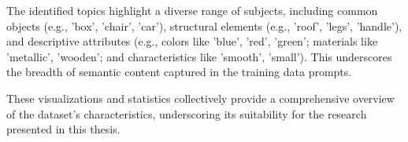 The identified topics highlight a diverse range of subjects, including common objects (e.g., 'box', 'chair', 'car'), structural elements (e.g., 'roof', 'legs', 'handle'), and descriptive attributes (e.g., colors like 'blue', 'red', 'green'; materials like 'metallic', 'wooden'; and characteristics like 'smooth', 'small'). This underscores the breadth of semantic content captured in the training data prompts.

These visualizations and statistics collectively provide a comprehensive overview of the dataset's characteristics, underscoring its suitability for the research presented in this thesis.
